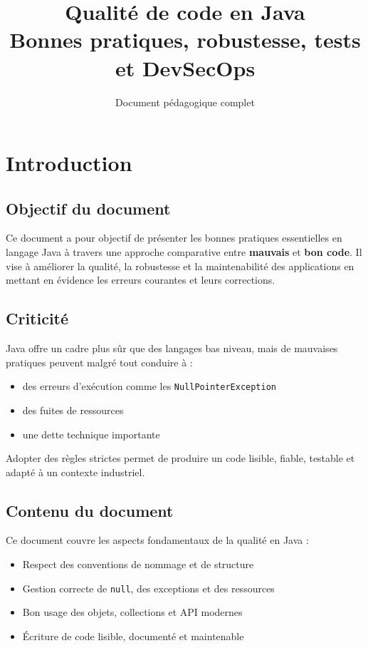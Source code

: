 \documentclass[a4paper,11pt]{report}
\title{\textbf{Qualité de code en Java}\\
Bonnes pratiques, robustesse, tests et DevSecOps}
\author{Document pédagogique complet}
\begin{document}
\maketitle
\tableofcontents
\newpage

\chapter{Introduction}

\section{Objectif du document}

Ce document a pour objectif de présenter les bonnes pratiques essentielles en langage Java à travers une approche comparative entre \textbf{mauvais} et \textbf{bon code}. Il vise à améliorer la qualité, la robustesse et la maintenabilité des applications en mettant en évidence les erreurs courantes et leurs corrections.

\section{Criticité}

Java offre un cadre plus sûr que des langages bas niveau, mais de mauvaises pratiques peuvent malgré tout conduire à :
\begin{itemize}
  \item des erreurs d'exécution comme les \texttt{NullPointerException}
  \item des fuites de ressources
  \item une dette technique importante
\end{itemize}

Adopter des règles strictes permet de produire un code lisible, fiable, testable et adapté à un contexte industriel.

\section{Contenu du document}

Ce document couvre les aspects fondamentaux de la qualité en Java :
\begin{itemize}
  \item Respect des conventions de nommage et de structure
  \item Gestion correcte de \texttt{null}, des exceptions et des ressources
  \item Bon usage des objets, collections et API modernes
  \item Écriture de code lisible, documenté et maintenable
\end{itemize}
\end{document}
